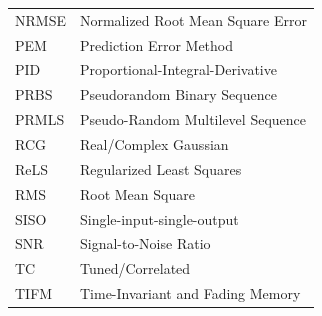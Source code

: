 \documentclass[11pt,twoside]{report}
\begin{document}
\begin{longtable}{p{} p{}}
NRMSE & Normalized Root Mean Square Error \\
PEM & Prediction Error Method \\
PID & Proportional-Integral-Derivative \\
PRBS & Pseudorandom Binary Sequence \\
PRMLS & Pseudo-Random Multilevel Sequence \\
RCG & Real/Complex Gaussian \\
ReLS & Regularized Least Squares \\
RMS & Root Mean Square \\
SISO & Single-input-single-output \\
SNR & Signal-to-Noise Ratio \\
TC & Tuned/Correlated \\
TIFM & Time-Invariant and Fading Memory 
\end{longtable}
\thispagestyle{plain}
\end{document}
